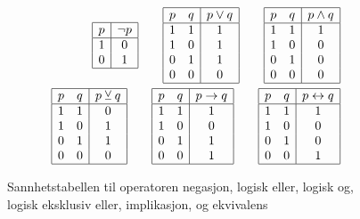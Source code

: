 \begin{figure}[h]
\centering
\begin{align*}
    \begin{array}{|c|c|}
        \hline
        p & \neg p\\
        \hline
        1 & 0 \\
        0 & 1 \\
        \hline
    \end{array}
    \qquad
    \begin{array}{|c c|c|}
        \hline
        p & q & p \lor q\\
        \hline
        1 & 1 & 1\\
        1 & 0 & 1\\
        0 & 1 & 1\\
        0 & 0 & 0\\
        \hline
    \end{array}
    \qquad
    \begin{array}{|c c|c|}
        \hline
        p & q & p \land q\\
        \hline
        1 & 1 & 1\\
        1 & 0 & 0\\
        0 & 1 & 0\\
        0 & 0 & 0\\
        \hline
    \end{array}\\
    \begin{array}{|c c|c|}
        \hline
        p & q & p \veebar q\\
        \hline
        1 & 1 & 0\\
        1 & 0 & 1\\
        0 & 1 & 1\\
        0 & 0 & 0\\
        \hline
    \end{array}
    \qquad
    \begin{array}{|c c|c|}
        \hline
        p & q & p \to q\\
        \hline
        1 & 1 & 1\\
        1 & 0 & 0\\
        0 & 1 & 1\\
        0 & 0 & 1\\
        \hline
    \end{array}
    \qquad
    \begin{array}{|c c|c|}
        \hline
        p & q & p \leftrightarrow q\\
        \hline
        1 & 1 & 1\\
        1 & 0 & 0\\
        0 & 1 & 0\\
        0 & 0 & 1\\
        \hline
    \end{array}
\end{align*}
\caption{Sannhetstabellen til operatoren negasjon, logisk eller, logisk og, logisk eksklusiv eller, implikasjon, og ekvivalens}
\label{figure:truth_tables}
\end{figure}

